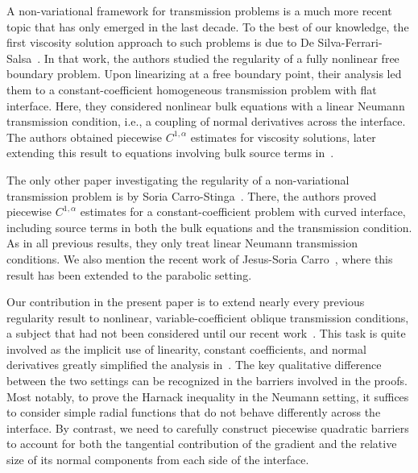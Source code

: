 \documentclass[letter,11pt]{amsart}
\theoremstyle{definition}
\numberwithin{equation}{section}
\begin{document}
\medskip

A non-variational framework for transmission problems is a much more recent topic that has only emerged in the last decade.
To the best of our knowledge, the first viscosity solution approach to such problems is due to De Silva-Ferrari-Salsa~\cite{DFSfb}.
In that work, the authors studied the regularity of a fully nonlinear free boundary problem.
Upon linearizing at a free boundary point, their analysis led them to a constant-coefficient homogeneous transmission problem with flat interface.
Here, they considered nonlinear bulk equations with a linear Neumann transmission condition, i.e., a coupling of normal derivatives across the interface.
The authors obtained piecewise $C^{1,\alpha}$ estimates for viscosity solutions, later extending this result to equations involving bulk source terms in~\cite{DFS}.

\medskip

The only other paper investigating  the regularity of a non-variational transmission problem is by Soria Carro-Stinga~\cite{SS}.
There, the authors proved piecewise $C^{1,\alpha}$ estimates for a constant-coefficient problem with curved interface, including source terms in both the bulk equations and the transmission condition.
As in all previous results, they only treat linear Neumann transmission conditions.
We also mention the recent work of Jesus-Soria Carro~\cite{JS}, where this result has been extended to the parabolic setting.

\medskip

Our contribution in the present paper is to extend nearly every previous regularity result to nonlinear, variable-coefficient oblique transmission conditions, a subject that had not been considered until our recent work~\cite{E}.
This task is quite involved as the implicit use of linearity, constant coefficients, and normal derivatives greatly simplified the analysis in~\cite{DFSfb,DFS,SS}.
The key qualitative difference between the two settings can be recognized in the barriers involved in the proofs.
Most notably, to prove the Harnack inequality in the Neumann setting, it suffices to consider simple radial functions that do not behave differently across the interface.
By contrast, we need to carefully construct piecewise quadratic barriers to account for both the tangential contribution of the gradient and the relative size of its normal components from each side of the interface.

\medskip
\end{document}
